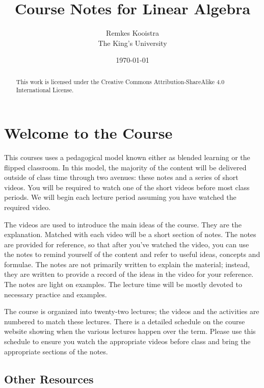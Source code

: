 \documentclass[fleqn]{report}
\begin{document}
\title{Course Notes for Linear Algebra}
\author{Remkes Kooistra \\
	The King's University}
\date{\today}
\maketitle

\setcounter{tocdepth}{0}
\tableofcontents
{}

\renewcommand{\chaptername}{Lecture}
\renewcommand{\abstractname}{License}

\begin{abstract}
This work is licensed under the Creative Commons
Attribution-ShareAlike 4.0 International License.
\end{abstract}

\chapter*{Welcome to the Course}
\label{welcome}

This courses uses a pedagogical model known either as blended
learning or the flipped classroom. In this model, the majority of the
content will be delivered outside of class time through
two avenues: these notes and a series of short videos.
You will be required to watch one of the short videos 
before most class periods. We will
begin each lecture period assuming you have watched the
required video.

The videos are used to introduce the main ideas of the
course. They are the explanation. Matched with each video 
will be a short section of notes. The
notes are provided for reference, so that after you've watched
the video, you can use the notes to remind yourself of the
content and refer to useful ideas, concepts and formulae. The
notes are not primarily written to explain the material;
instead, they are written to provide a record of the ideas in
the video for your reference. The notes are light on
examples. The lecture time will be mostly devoted to
necessary practice and examples.

The course is organized into twenty-two lectures; the videos
and the activities are numbered to match these lectures. There
is a detailed schedule on the course website showing when the
various lectures happen over the term. Please use this
schedule to ensure you watch the appropriate videos before
class and bring the appropriate sections of the notes. 

\section*{Other Resources}
\end{document}
